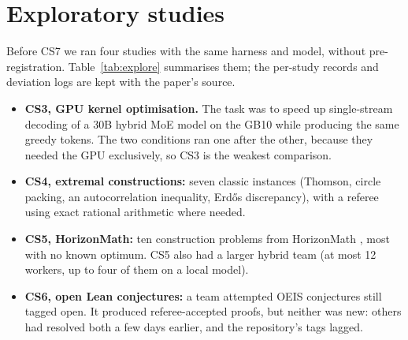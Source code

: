 \documentclass[11pt]{article}
\begin{document}
\section{Exploratory studies}
\label{sec:explore}
Before CS7 we ran four studies with the same harness and model, without pre-registration. Table~\ref{tab:explore}
summarises them; the per-study records and deviation logs are kept with the paper's source.
\begin{itemize}
  \item \textbf{CS3, GPU kernel optimisation.} The task was to speed up single-stream decoding of a 30B hybrid MoE model
    on the GB10 while producing the same greedy tokens. The two conditions ran one after the other, because they
    needed the GPU exclusively, so CS3 is the weakest comparison.
  \item \textbf{CS4, extremal constructions:} seven classic instances (Thomson, circle packing, an autocorrelation
    inequality, Erd\H{o}s discrepancy), with a referee using exact rational arithmetic where needed.
  \item \textbf{CS5, HorizonMath:} ten construction problems from HorizonMath \citep{wang2026horizonmath}, most with no
    known optimum. CS5 also had a larger hybrid team (at most 12 workers, up to four of them on a local model).
  \item \textbf{CS6, open Lean conjectures:} a team attempted OEIS conjectures still tagged open. It produced
    \CSsixOAccepted{} referee-accepted proofs, but neither was new: others had resolved both a few days earlier, and the
    repository's tags lagged.
\end{itemize}
\end{document}
